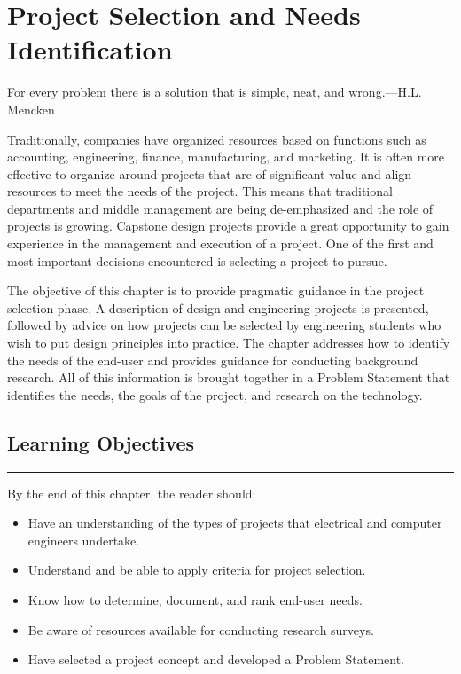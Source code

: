 \chapter{Project Selection and Needs Identification}
\graphicspath{ {./chapter02/Fig} }

\begin{itquote}
For every problem there is a solution that is simple, neat, and
wrong.---H.L. Mencken
\end{itquote}

Traditionally, companies have organized resources based on functions
such as accounting, engineering, finance, manufacturing, and marketing.
It is often more effective to organize around projects that are of
significant value and align resources to meet the needs of the project.
This means that traditional departments and middle management are being
de-emphasized and the role of projects is growing. Capstone design
projects provide a great opportunity to gain experience in the
management and execution of a project. One of the first and most
important decisions encountered is selecting a project to pursue.

The objective of this chapter is to provide pragmatic guidance in the
project selection phase. A description of design and engineering
projects is presented, followed by advice on how projects can be
selected by engineering students who wish to put design principles into
practice. The chapter addresses how to identify the needs of the
end-user and provides guidance for conducting background research. All
of this information is brought together in a Problem Statement that
identifies the needs, the goals of the project, and research on the
technology.

\section*{Learning Objectives}
\noindent\rule{\linewidth}{1pt}
By the end of this chapter, the reader should:
\begin{itemize}
\item
  Have an understanding of the types of projects that electrical and
  computer engineers undertake.
\item
  Understand and be able to apply criteria for project selection.
\item
  Know how to determine, document, and rank end-user needs.
\item
  Be aware of resources available for conducting research surveys.
\item
  Have selected a project concept and developed a Problem Statement.
\end{itemize}

